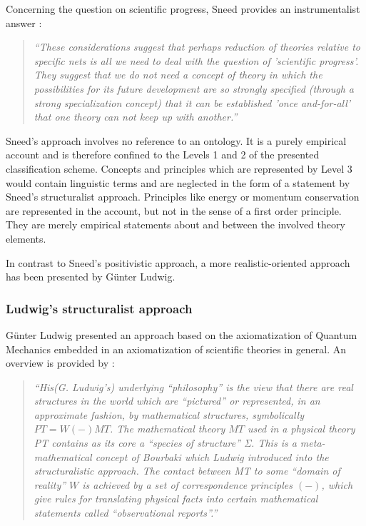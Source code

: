 \documentclass{article}
\begin{document}
Concerning the question on scientific progress, Sneed provides an instrumentalist answer \cite[p.143]{sneed1976philosophical}:

\begin{quote}
\textit{``These considerations suggest that perhaps reduction of theories relative to specific nets is all we need to deal with the question of 'scientific progress'. They suggest that we do not need a concept of theory in which the possibilities for its future development are so strongly specified (through a strong specialization concept) that it can be established 'once and-for-all' that one theory can not keep up with another.''}
\end{quote}

Sneed's approach involves no reference to an ontology. It is a purely empirical account and is therefore confined to the Levels 1 and 2 of the presented classification scheme. Concepts and principles which are represented by Level 3 would contain linguistic terms and are neglected in the form of a statement by Sneed's structuralist approach. Principles like energy or momentum conservation are represented in the account, but not in the sense of a first order principle. They are merely empirical statements about and between the involved theory elements.

In contrast to Sneed's positivistic approach, a more realistic-oriented approach has been presented by G\"unter Ludwig.

\subsubsection{Ludwig's structuralist approach}
\label{section Ludwig structuralist}

G\"unter Ludwig presented an approach based on the axiomatization of Quantum Mechanics embedded in an axiomatization of scientific theories in general. An overview is provided by \cite[]{sep-physics-structuralism}:

\begin{quote}
\textit{``His(G. Ludwig's) underlying “philosophy” is the view that there are real structures in the world which are “pictured” or represented, in an approximate fashion, by mathematical structures, symbolically $ PT=W(-)MT $. The mathematical theory $MT$ used in a physical theory PT contains as its core a “species of structure” Σ. This is a meta-mathematical concept of Bourbaki which Ludwig introduced into the structuralistic approach. The contact between MT to some “domain of reality” $W$ is achieved by a set of correspondence principles  $(-)$, which give rules for translating physical facts into certain mathematical statements called “observational reports”.''}
\end{quote} 
\end{document}
